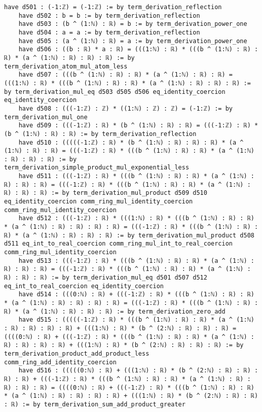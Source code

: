 \documentclass{article}
\begin{document}
\begin{tcolorbox}[colback=white!10, width=\linewidth]
\begin{lstlisting}[language=Lean4]
    have d501 : (-1:ℤ) = (-1:ℤ) := by term_derivation_reflection
    have d502 : b = b := by term_derivation_reflection
    have d503 : (b ^ (1:ℕ) : ℝ) = b := by term_derivation_power_one
    have d504 : a = a := by term_derivation_reflection
    have d505 : (a ^ (1:ℕ) : ℝ) = a := by term_derivation_power_one
    have d506 : ((b : ℝ) * a : ℝ) = (((1:ℕ) : ℝ) * (((b ^ (1:ℕ) : ℝ) : ℝ) * (a ^ (1:ℕ) : ℝ) : ℝ) : ℝ) := by term_derivation_atom_mul_atom_less
    have d507 : (((b ^ (1:ℕ) : ℝ) : ℝ) * (a ^ (1:ℕ) : ℝ) : ℝ) = (((1:ℕ) : ℝ) * (((b ^ (1:ℕ) : ℝ) : ℝ) * (a ^ (1:ℕ) : ℝ) : ℝ) : ℝ) := by term_derivation_mul_eq d503 d505 d506 eq_identity_coercion eq_identity_coercion
    have d508 : (((-1:ℤ) : ℤ) * ((1:ℕ) : ℤ) : ℤ) = (-1:ℤ) := by term_derivation_mul_one
    have d509 : (((-1:ℤ) : ℝ) * (b ^ (1:ℕ) : ℝ) : ℝ) = (((-1:ℤ) : ℝ) * (b ^ (1:ℕ) : ℝ) : ℝ) := by term_derivation_reflection
    have d510 : (((((-1:ℤ) : ℝ) * (b ^ (1:ℕ) : ℝ) : ℝ) : ℝ) * (a ^ (1:ℕ) : ℝ) : ℝ) = (((-1:ℤ) : ℝ) * (((b ^ (1:ℕ) : ℝ) : ℝ) * (a ^ (1:ℕ) : ℝ) : ℝ) : ℝ) := by term_derivation_simple_product_mul_exponential_less
    have d511 : (((-1:ℤ) : ℝ) * (((b ^ (1:ℕ) : ℝ) : ℝ) * (a ^ (1:ℕ) : ℝ) : ℝ) : ℝ) = (((-1:ℤ) : ℝ) * (((b ^ (1:ℕ) : ℝ) : ℝ) * (a ^ (1:ℕ) : ℝ) : ℝ) : ℝ) := by term_derivation_mul_product d509 d510 eq_identity_coercion comm_ring_mul_identity_coercion comm_ring_mul_identity_coercion
    have d512 : (((-1:ℤ) : ℝ) * (((1:ℕ) : ℝ) * (((b ^ (1:ℕ) : ℝ) : ℝ) * (a ^ (1:ℕ) : ℝ) : ℝ) : ℝ) : ℝ) = (((-1:ℤ) : ℝ) * (((b ^ (1:ℕ) : ℝ) : ℝ) * (a ^ (1:ℕ) : ℝ) : ℝ) : ℝ) := by term_derivation_mul_product d508 d511 eq_int_to_real_coercion comm_ring_mul_int_to_real_coercion comm_ring_mul_identity_coercion
    have d513 : (((-1:ℤ) : ℝ) * (((b ^ (1:ℕ) : ℝ) : ℝ) * (a ^ (1:ℕ) : ℝ) : ℝ) : ℝ) = (((-1:ℤ) : ℝ) * (((b ^ (1:ℕ) : ℝ) : ℝ) * (a ^ (1:ℕ) : ℝ) : ℝ) : ℝ) := by term_derivation_mul_eq d501 d507 d512 eq_int_to_real_coercion eq_identity_coercion
    have d514 : (((0:ℕ) : ℝ) + (((-1:ℤ) : ℝ) * (((b ^ (1:ℕ) : ℝ) : ℝ) * (a ^ (1:ℕ) : ℝ) : ℝ) : ℝ) : ℝ) = (((-1:ℤ) : ℝ) * (((b ^ (1:ℕ) : ℝ) : ℝ) * (a ^ (1:ℕ) : ℝ) : ℝ) : ℝ) := by term_derivation_zero_add
    have d515 : (((((-1:ℤ) : ℝ) * (((b ^ (1:ℕ) : ℝ) : ℝ) * (a ^ (1:ℕ) : ℝ) : ℝ) : ℝ) : ℝ) + (((1:ℕ) : ℝ) * (b ^ (2:ℕ) : ℝ) : ℝ) : ℝ) = ((((0:ℕ) : ℝ) + (((-1:ℤ) : ℝ) * (((b ^ (1:ℕ) : ℝ) : ℝ) * (a ^ (1:ℕ) : ℝ) : ℝ) : ℝ) : ℝ) + (((1:ℕ) : ℝ) * (b ^ (2:ℕ) : ℝ) : ℝ) : ℝ) := by term_derivation_product_add_product_less comm_ring_add_identity_coercion
    have d516 : (((((0:ℕ) : ℝ) + (((1:ℕ) : ℝ) * (b ^ (2:ℕ) : ℝ) : ℝ) : ℝ) : ℝ) + (((-1:ℤ) : ℝ) * (((b ^ (1:ℕ) : ℝ) : ℝ) * (a ^ (1:ℕ) : ℝ) : ℝ) : ℝ) : ℝ) = ((((0:ℕ) : ℝ) + (((-1:ℤ) : ℝ) * (((b ^ (1:ℕ) : ℝ) : ℝ) * (a ^ (1:ℕ) : ℝ) : ℝ) : ℝ) : ℝ) + (((1:ℕ) : ℝ) * (b ^ (2:ℕ) : ℝ) : ℝ) : ℝ) := by term_derivation_sum_add_product_greater

\end{lstlisting}
\end{tcolorbox}
\end{document}
